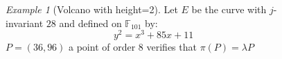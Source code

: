\documentclass[10pt,a4paper]{beamer}
\theoremstyle{plain}
\theoremstyle{definition}
\theoremstyle{definition}
\theoremstyle{definition}
\theoremstyle{definition}
\theoremstyle{remark}
\theoremstyle{remark}
\newtheorem{exe}[thm]{Example}
\begin{document}
\begin{frame}
\begin{columns}
\begin{column}[r]{6cm}
{\begin{figure}[h]
\begin{center}
	\end{center}
\end{figure}}
\end{column}
\end{columns}
\end{frame}


\begin{frame}
\begin{columns}

\begin{column}[l]{4cm}
\begin{exe}[Volcano with height=2]
Let $E$ be the curve with $j$-invariant $28$ and defined on $\mathbb{F}_{101}$ by: 
\[y^2=x^3+85x+11\]
$P=(36,96)$ a point of order $8$ verifies that $\pi(P)=\lambda P$


\begin{itemize}
\end{itemize}


\end{exe}
\end{column}

\begin{column}[r]{7cm}
\begin{figure}[h]
		\begin{center}
		

\end{center}
\end{figure}
\end{column}
\end{columns}
\end{frame}
\end{document}
